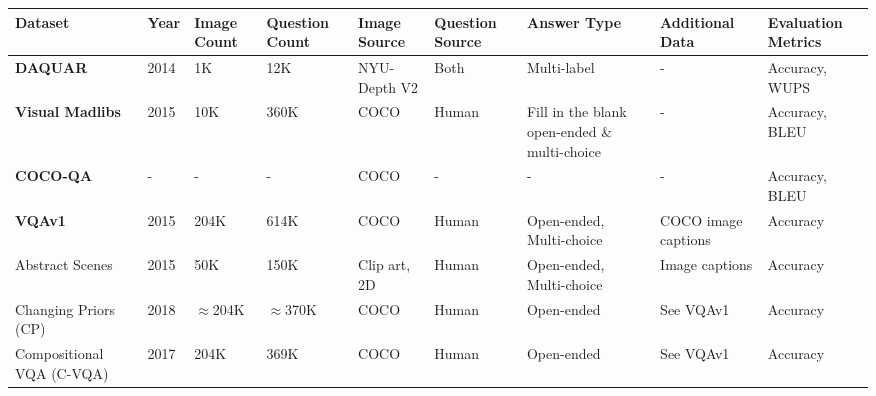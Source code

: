 \begin{center}
\begin{xltabular}{\textwidth}{LLLLLLLLL}
  \toprule
  \textbf{Dataset}
  & \textbf{Year}
  & \textbf{Image Count}
  & \textbf{Question Count}
  & \textbf{Image Source}
  & \textbf{Question Source}
  & \textbf{Answer Type}
  & \textbf{Additional Data}
  & \textbf{Evaluation Metrics}\\
  \midrule
  \textbf{DAQUAR} \cite{malinowski2014multiworld}
  & 2014
  & 1K  %
  & 12K  %
  & NYU-Depth V2 \cite{silberman2012indoor}
  & Both
  & Multi-label  %
  & -
  & Accuracy, WUPS \\
  \textbf{Visual Madlibs} \cite{yu2015visual}
  & 2015
  & 10K  %
  & 360K  %
  & COCO \cite{lin2014microsoft}
  & Human
  & Fill in the blank open-ended \& multi-choice
  & -
  & Accuracy, BLEU \\
  \textbf{COCO-QA}
  & -
  & -
  & -
  & COCO
  & -
  & -
  & -
  & Accuracy, BLEU \\
  \textbf{VQAv1} \cite{antol2015vqa}
  & 2015
  & 204K  %
  & 614K  %
  & COCO
  & Human
  & Open-ended, Multi-choice
  & COCO image captions
  & Accuracy\footnotemark \\
  Abstract Scenes
  & 2015
  & 50K  %
  & 150K  %
  & Clip art, 2D
  & Human
  & Open-ended, Multi-choice
  & Image captions
  & Accuracy\footnotemark[\value{footnote}] \\
  Changing Priors (CP) \cite{agrawal2018dont}
  & 2018
  & {\color{red}\(\approx\)204K}  %
  & {\color{red}\(\approx\)370K}  %
  & COCO
  & Human
  & Open-ended
  & See VQAv1
  & Accuracy\footnotemark[\value{footnote}] \\
  Compositional VQA (C-VQA) \cite{agrawal2017cvqa}
  & 2017
  & 204K  %
  & 369K  %
  & COCO
  & Human
  & Open-ended
  & See VQAv1
  & Accuracy\footnotemark[\value{footnote}] \\

\end{xltabular}
\end{center}
